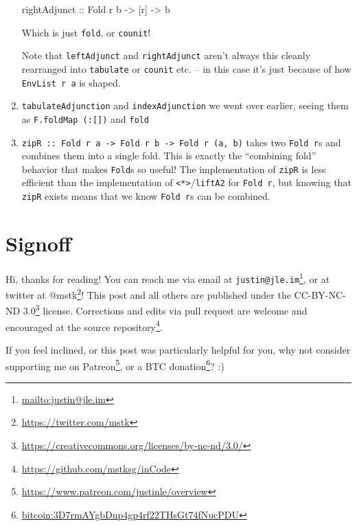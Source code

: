 \documentclass[]{article}
\newenvironment{Shaded}{}{}
\newcommand{\DataTypeTok}[1]{\textcolor[rgb]{0.56,0.13,0.00}{#1}}
\newcommand{\NormalTok}[1]{#1}
\newcommand{\OtherTok}[1]{\textcolor[rgb]{0.00,0.44,0.13}{#1}}
\renewcommand{\href}[2]{#2\footnote{\url{#1}}}
\begin{document}
\begin{enumerate}
\begin{Shaded}
\begin{Highlighting}[]
\OtherTok{rightAdjunct\textquotesingle{} ::} \DataTypeTok{Fold}\NormalTok{ r b }\OtherTok{{-}>}\NormalTok{ [r] }\OtherTok{{-}>}\NormalTok{ b}
\end{Highlighting}
\end{Shaded}

  Which is just \texttt{fold}, or \texttt{counit}!

  Note that \texttt{leftAdjunct} and \texttt{rightAdjunct} aren't always this
  cleanly rearranged into \texttt{tabulate} or \texttt{counit} etc. -- in this
  case it's just because of how \texttt{EnvList\ r\ a} is shaped.
\item
  \texttt{tabulateAdjunction} and \texttt{indexAdjunction} we went over earlier,
  seeing them as \texttt{F.foldMap\ (:{[}{]})} and \texttt{fold}
\item
  \texttt{zipR\ ::\ Fold\ r\ a\ -\textgreater{}\ Fold\ r\ b\ -\textgreater{}\ Fold\ r\ (a,\ b)}
  takes two \texttt{Fold\ r}s and combines them into a single fold. This is
  exactly the ``combining fold'' behavior that makes \texttt{Fold}s so useful!
  The implementation of \texttt{zipR} is less efficient than the implementation
  of \texttt{\textless{}*\textgreater{}}/\texttt{liftA2} for \texttt{Fold\ r},
  but knowing that \texttt{zipR} exists means that we know \texttt{Fold\ r}s can
  be combined.
\end{enumerate}

\hypertarget{signoff}{%
\section{Signoff}\label{signoff}}

Hi, thanks for reading! You can reach me via email at
\href{mailto:justin@jle.im}{\nolinkurl{justin@jle.im}}, or at twitter at
\href{https://twitter.com/mstk}{@mstk}! This post and all others are published
under the \href{https://creativecommons.org/licenses/by-nc-nd/3.0/}{CC-BY-NC-ND
3.0} license. Corrections and edits via pull request are welcome and encouraged
at \href{https://github.com/mstksg/inCode}{the source repository}.

If you feel inclined, or this post was particularly helpful for you, why not
consider \href{https://www.patreon.com/justinle/overview}{supporting me on
Patreon}, or a \href{bitcoin:3D7rmAYgbDnp4gp4rf22THsGt74fNucPDU}{BTC donation}?
:)
\end{document}
